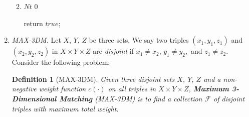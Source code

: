 \documentclass[12pt,a4paper]{article}
\makeatletter
\newtheorem*{solution}{Solution}
\newtheorem{definition}{Definition}
\theoremstyle{definition}
\renewenvironment{solution}[1][Solution] {\par\pushQED{\qed}\normalfont\topsep6\p@\@plus6\p@\relax\trivlist\item[\hskip\labelsep\bfseries#1\@addpunct{.}]\ignorespaces}{\popQED\endtrivlist\@endpefalse} \makeatother
\makeatother
\begin{document}
\begin{enumerate}
\begin{enumerate}
\begin{solution}
\begin{algorithm}[H]
		\BlankLine
		\caption{}\label{Algorithm}
		
		
        
        $Nt$ \leftarrow $0$\;
        
        return $true$;
        
            		
		
		
		
	    \end{algorithm}

            \end{solution}
    \end{enumerate}

\item \textit{MAX-3DM.} Let $X$, $Y$, $Z$ be three sets. We say two triples $\left(x_{1}, y_{1}, z_{1}\right)$ and $\left(x_{2}, y_{2}, z_{2}\right)$ in $X \times Y \times Z$ are \textit{disjoint} if $x_{1} \neq x_{2}$, $y_{1} \neq y_{2},$ and $z_{1} \neq z_{2}$. Consider the following problem:
    
    \begin{definition}[MAX-3DM] 
        Given three disjoint sets $X$, $Y$, $Z$ and a non-negative weight function $c(\cdot)$ on all triples in $X \times Y \times Z$, \textbf{Maximum 3-Dimensional Matching} (MAX-3DM) is to find a collection $\mathcal{F}$ of disjoint triples with maximum total weight.
    \end{definition}


\end{enumerate}
\end{document}
